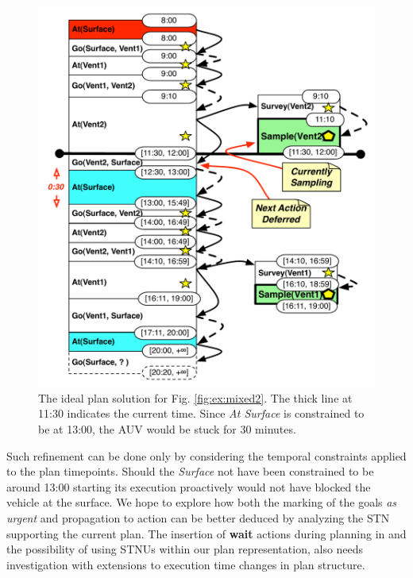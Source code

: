 \begin{figure}
  \centering
  \includegraphics[width=0.7\columnwidth]{figs/example_ideal}
  \vskip-3mm
  \caption{\small The ideal plan solution for
    Fig. \ref{fig:ex:mixed2}. The thick line at 11:30 indicates the
    current time. Since {\em At Surface} is constrained to be at
    13:00, the AUV would be stuck for $30$ minutes.}
  \label{fig:res:ideal}
  \vskip-3mm
\end{figure}
 
Such refinement can be done only by considering the temporal
constraints applied to the plan timepoints. Should the {\em Surface}
not have been constrained to be around 13:00 starting its execution
proactively would not have blocked the vehicle at the surface. We hope
to explore how both the marking of the goals {\em as urgent} and
propagation to action can be better deduced by analyzing the STN
supporting the current plan. The insertion of {\bf wait} actions
during planning in \cite{morris01} and the possibility of using STNUs
within our plan representation, also needs investigation with
extensions to execution time changes in plan structure.

